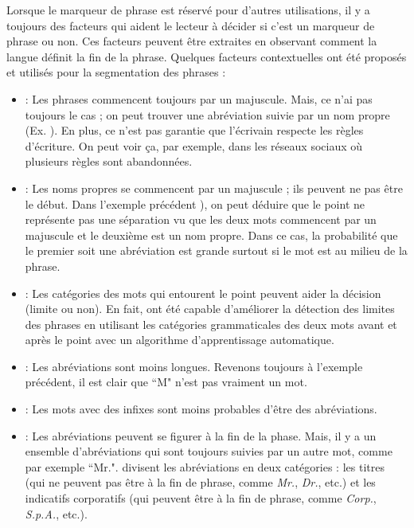 \documentclass{KodeBook}
\begin{document}
Lorsque le marqueur de phrase est réservé pour d'autres utilisations, il y a toujours des facteurs qui aident le lecteur à décider si c'est un marqueur de phrase ou non.
Ces facteurs peuvent être extraites en observant comment la langue définit la fin de la phrase. 
Quelques facteurs contextuelles ont été proposés et utilisés pour la segmentation des phrases \cite{10-palmer} :
\begin{itemize}
	\item {} : Les phrases commencent toujours par un majuscule. 
	Mais, ce n'ai pas toujours le cas ; on peut trouver une abréviation suivie par un nom propre (Ex. ). 
	En plus, ce n'est pas garantie que l'écrivain respecte les règles d'écriture. 
	On peut voir ça, par exemple, dans les réseaux sociaux où plusieurs règles sont abandonnées.
	
	\item {} : Les noms propres se commencent par un majuscule ; ils peuvent ne pas être le début.
	Dans l'exemple précédent ), on peut déduire que le point ne représente pas une séparation vu que les deux mots commencent par un majuscule et le deuxième est un nom propre. 
	Dans ce cas, la probabilité que le premier soit une abréviation est grande surtout si le mot est au milieu de la phrase.
	
	\item {} : Les catégories des mots qui entourent le point peuvent aider la décision (limite ou non). 
	En fait,  \cite{97-palmer-hearst} ont été capable d'améliorer la détection des limites des phrases en utilisant les catégories grammaticales des deux mots avant et après le point avec un algorithme d'apprentissage automatique. 
	
	\item {} : Les abréviations sont moins longues.
	Revenons toujours à l'exemple précédent, il est clair que ``M" n'est pas vraiment un mot. 
	
	\item {} : Les mots avec des infixes sont moins probables d'être des abréviations.
	
	\item {} : Les abréviations peuvent se figurer à la fin de la phase. 
	Mais, il y a un ensemble d'abréviations qui sont toujours suivies par un autre mot, comme par exemple ``Mr.".
	\cite{89-riley,97-reynar-ratnaparkhi} divisent les abréviations en deux catégories : les titres (qui ne peuvent pas être à la fin de phrase, comme \textit{Mr.}, \textit{Dr.}, etc.) et les indicatifs corporatifs (qui peuvent être à la fin de phrase, comme \textit{Corp.}, \textit{S.p.A.}, etc.).
\end{itemize}
\end{document}
